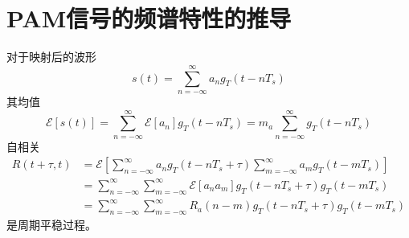 \section{PAM信号的频谱特性的推导}
    对于映射后的波形
    \begin{equation*}
        s(t)=\sum_{n=-\infty}^{\infty}a_ng_T(t-nT_s)
    \end{equation*}
    其均值
    \begin{equation*}
        \mathscr{E}[s(t)]=\sum_{n=-\infty}^{\infty}\mathscr{E}[a_n]g_T(t-nT_s)=m_a\sum_{n=-\infty}^{\infty}g_T(t-nT_s)
    \end{equation*}
    自相关
    \begin{equation*}
        \begin{split}
            R(t+\tau,t) &=\mathscr{E}\left[\sum_{n=-\infty}^{\infty}a_ng_T(t-nT_s+\tau)\sum_{m=-\infty}^{\infty}a_mg_T(t-mT_s)\right]\\
                        &=\sum_{n=-\infty}^{\infty}\sum_{m=-\infty}^{\infty}\mathscr{E}[a_na_m]g_T(t-nT_s+\tau)g_T(t-mT_s)\\
                        &=\sum_{n=-\infty}^{\infty}\sum_{m=-\infty}^{\infty}R_a(n-m)g_T(t-nT_s+\tau)g_T(t-mT_s)
        \end{split}
    \end{equation*}
    是周期平稳过程。

